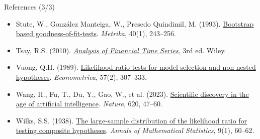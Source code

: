\begin{frame}{References (3/3)}
\begin{itemize}
    \item Stute, W., González Manteiga, W., Presedo Quindimil, M. (1993). \href{https://doi.org/10.1007/BF02613687}{Bootstrap based goodness-of-fit-tests}. \textit{Metrika}, 40(1), 243--256.
    \item Tsay, R.S. (2010). \href{https://doi.org/10.1002/9780470644560}{\textit{Analysis of Financial Time Series}}, 3rd ed. Wiley.
    \item Vuong, Q.H. (1989). \href{https://doi.org/10.2307/1912557}{Likelihood ratio tests for model selection and non-nested hypotheses}. \textit{Econometrica}, 57(2), 307--333.
    \item Wang, H., Fu, T., Du, Y., Gao, W., et al. (2023). \href{https://doi.org/10.1038/s41586-023-06221-2}{Scientific discovery in the age of artificial intelligence}. \textit{Nature}, 620, 47--60.
    \item Wilks, S.S. (1938). \href{https://doi.org/10.1214/aoms/1177732360}{The large-sample distribution of the likelihood ratio for testing composite hypotheses}. \textit{Annals of Mathematical Statistics}, 9(1), 60--62.
\end{itemize}
\end{frame}



